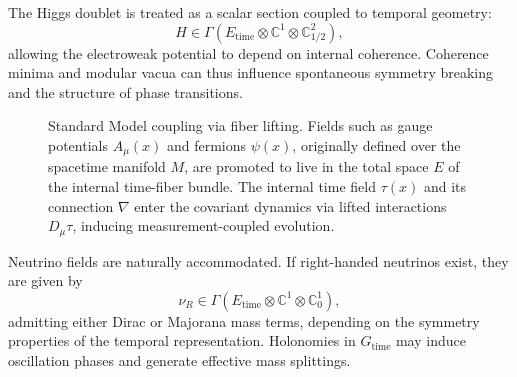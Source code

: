 \documentclass[11pt]{article}
\begin{document}
The Higgs doublet is treated as a scalar section coupled to temporal geometry:
\begin{equation}
H \in \Gamma\left(E_{\mathrm{time}} \otimes \mathbb{C}^1 \otimes \mathbb{C}^2_{1/2}\right),
\end{equation}
allowing the electroweak potential to depend on internal coherence. Coherence minima and modular vacua can thus influence spontaneous symmetry breaking and the structure of phase transitions.
\begin{figure}[ht]
\centering
{}
\caption{Standard Model coupling via fiber lifting. Fields such as gauge potentials \( A_\mu(x) \) and fermions \( \psi(x) \), originally defined over the spacetime manifold \( M \), are promoted to live in the total space \( E \) of the internal time-fiber bundle. The internal time field \( \tau(x) \) and its connection \( \nabla \) enter the covariant dynamics via lifted interactions \( D_\mu \tau \), inducing measurement-coupled evolution.}
\label{fig:sm_fiber_lifting}
\end{figure}
Neutrino fields are naturally accommodated. If right-handed neutrinos exist, they are given by
\begin{equation}
\nu_R \in \Gamma\left(E_{\mathrm{time}} \otimes \mathbb{C}^1 \otimes \mathbb{C}^1_0\right),
\end{equation}
admitting either Dirac or Majorana mass terms, depending on the symmetry properties of the temporal representation. Holonomies in \( G_{\mathrm{time}} \) may induce oscillation phases and generate effective mass splittings.
\end{document}
